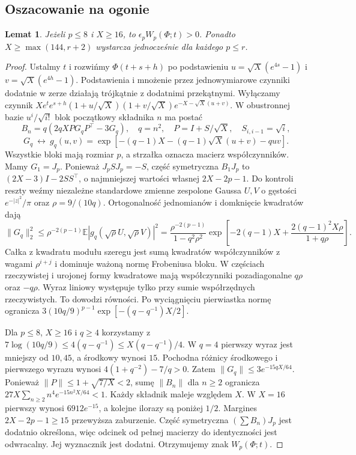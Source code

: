 \documentclass[11pt,a4paper,reqno]{amsart}
\newtheorem{lemma}[theorem]{Lemat}
\numberwithin{equation}{section}
\begin{document}
\subsection{Oszacowanie na ogonie}\label{sec:tail}


\begin{lemma}\label{lem:tail}
Jeżeli \(p\le8\) i \(X\ge16\), to \(\epsilon_p W_p(\Phi;t)>0\). Ponadto \(X\ge\max(144,r+2)\) wystarcza jednocześnie dla każdego \(p\le r\).
\end{lemma}


\begin{proof}
Ustalmy \(t\) i rozwińmy \(\Phi(t+s+h)\) po podstawieniu \(u=\sqrt X(e^{4s}-1)\) i \(v=\sqrt X(e^{4h}-1)\). Podstawienia i mnożenie przez jednowymiarowe czynniki dodatnie w zerze działają trójkątnie z dodatnimi przekątnymi. Wyłączamy czynnik \(Xe^te^{s+h}(1+u/\sqrt X)(1+v/\sqrt X)e^{-X-\sqrt X(u+v)}\). W obustronnej bazie \(u^i/\sqrt{i!}\) blok początkowy składnika \(n\) ma postać \[B_n=q(2qX PG_qP^\top-3G_q),\quad q=n^2,\quad P=I+S/\sqrt X,\quad S_{i,i-1}=\sqrt i,\] \[G_q\ \longleftrightarrow\ g_q(u,v)=\exp[-(q-1)X-(q-1)\sqrt X(u+v)-quv].\] Wszystkie bloki mają rozmiar \(p\), a strzałka oznacza macierz współczynników. Mamy \(G_1=J_p\). Ponieważ \(J_p S J_p=-S\), część symetryczna \(B_1J_p\) to \((2X-3)I-2SS^\top\), o najmniejszej wartości własnej \(2X-2p-1\). Do kontroli reszty weźmy niezależne standardowe zmienne zespolone Gaussa \(U,V\) o gęstości \(e^{-|z|^2}/\pi\) oraz \(\rho=9/(10q)\). Ortogonalność jednomianów i domknięcie kwadratów dają \[\|G_q\|_2^2\le \rho^{-2(p-1)}\mathbb E|g_q(\sqrt\rho U,\sqrt\rho V)|^2
 =\frac{\rho^{-2(p-1)}}{1-q^2\rho^2}
  \exp\left[-2(q-1)X+\frac{2(q-1)^2X\rho}{1+q\rho}\right].\] Całka z kwadratu modułu szeregu jest sumą kwadratów współczynników z wagami \(\rho^{i+j}\) i dominuje ważoną normę Frobeniusa bloku. W częściach rzeczywistej i urojonej formy kwadratowe mają współczynniki pozadiagonalne \(q\rho\) oraz \(-q\rho\). Wyraz liniowy występuje tylko przy sumie współrzędnych rzeczywistych. To dowodzi równości. Po wyciągnięciu pierwiastka normę ogranicza \(3(10q/9)^{p-1}\exp[-(q-q^{-1})X/2]\).

Dla \(p\le8\), \(X\ge16\) i \(q\ge4\) korzystamy z \(7\log(10q/9)\le4(q-q^{-1})\le X(q-q^{-1})/4\). W \(q=4\) pierwszy wyraz jest mniejszy od \(10{,}45\), a środkowy wynosi \(15\). Pochodna różnicy środkowego i pierwszego wyrazu wynosi \(4(1+q^{-2})-7/q>0\). Zatem \(\|G_q\|\le3e^{-15qX/64}\). Ponieważ \(\|P\|\le1+\sqrt{7/X}<2\), sumę \(\|B_n\|\) dla \(n\ge2\) ogranicza \(27X\sum_{n\ge2}n^4e^{-15n^2X/64}<1\). Każdy składnik maleje względem \(X\). W \(X=16\) pierwszy wynosi \(6912e^{-15}\), a kolejne ilorazy są poniżej \(1/2\). Margines \(2X-2p-1\ge15\) przewyższa zaburzenie. Część symetryczna \((\sum B_n)J_p\) jest dodatnio określona, więc odcinek od pełnej macierzy do identyczności jest odwracalny. Jej wyznacznik jest dodatni. Otrzymujemy znak \(W_p(\Phi;t)\).


\end{proof}
\end{document}
